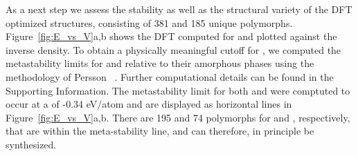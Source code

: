 %
%
As a next step we assess the stability as well as the structural variety of the DFT optimized structures, consisting of 381 \IrOtwo and 185 \IrOthree unique polymorphs.
%
Figure~\ref{fig:E_vs_V}a,b shows the DFT computed \DHf for \IrOtwo and \IrOthree plotted against the inverse density.
%
To obtain a physically meaningful cutoff for \DHf, we computed the metastability limits for \IrOtwo and \IrOthree relative to their amorphous phases using the methodology of Persson ~\cite{Aykol2018}.
%
Further computational details can be found in the Supporting Information.
%
The metastability limit for both \IrOtwo and \IrOthree were comptuted to occur at a \DHf of -0.34 eV/atom and are displayed as horizontal lines in Figure~\ref{fig:E_vs_V}a,b.
%
There are 195 and 74 polymorphs for \IrOtwo and \IrOthree, respectively, that are within the meta-stability line, and can therefore, in principle be synthesized.
%
%


